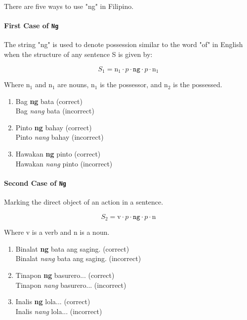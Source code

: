 \noindent There are five ways to use "ng" in Filipino.

\paragraph{First Case of \texttt{Ng}} The string "ng" is used to denote possession similar to
the word "of" in English when the structure of any sentence S is given by:

\[
      S_1 = \text{n}_1 \cdot p \cdot \texttt{ng} \cdot p \cdot \text{n}_1
\]

Where n$_1$ and n$_1$ are nouns,  n$_1$ is the possessor, and n$_2$ is the possessed.

\begin{example}
\end{example}

\begin{enumerate}
      \item Bag \textbf{ng} bata (correct)
            \\ Bag \textit{nang} bata (incorrect)
      \item Pinto \textbf{ng} bahay (correct)
            \\ Pinto \textit{nang} bahay (incorrect)
      \item Hawakan \textbf{ng} pinto (correct)
            \\ Hawakan \textit{nang} pinto (incorrect)
\end{enumerate}

\paragraph{Second Case of \texttt{Ng}} Marking the direct object of an action in a sentence.

\[
      S_2 = \text{v} \cdot p \cdot \texttt{ng} \cdot p \cdot \text{n}
\]

Where v is a verb and n is a noun.

\begin{example}
\end{example}

\begin{enumerate}
      \item Binalat \textbf{ng} bata ang saging. (correct)
            \\ Binalat \textit{nang} bata ang saging. (incorrect)
      \item Tinapon \textbf{ng} basurero... (correct)
            \\ Tinapon \textit{nang} basurero... (incorrect)
      \item Inalis \textbf{ng} lola... (correct)
            \\ Inalis \textit{nang} lola... (incorrect)
\end{enumerate}

